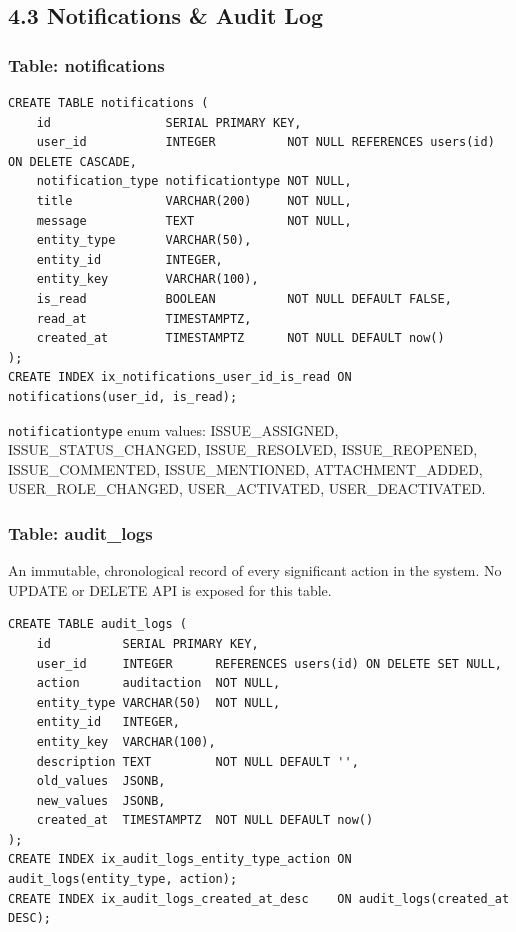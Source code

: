\documentclass[11pt]{article}
\begin{document}
\subsection{4.3 Notifications \& Audit Log}

\subsubsection{Table: notifications}
\begin{lstlisting}
CREATE TABLE notifications (
    id                SERIAL PRIMARY KEY,
    user_id           INTEGER          NOT NULL REFERENCES users(id) ON DELETE CASCADE,
    notification_type notificationtype NOT NULL,
    title             VARCHAR(200)     NOT NULL,
    message           TEXT             NOT NULL,
    entity_type       VARCHAR(50),
    entity_id         INTEGER,
    entity_key        VARCHAR(100),
    is_read           BOOLEAN          NOT NULL DEFAULT FALSE,
    read_at           TIMESTAMPTZ,
    created_at        TIMESTAMPTZ      NOT NULL DEFAULT now()
);
CREATE INDEX ix_notifications_user_id_is_read ON notifications(user_id, is_read);
\end{lstlisting}

\texttt{notificationtype} enum values: ISSUE\_ASSIGNED, ISSUE\_STATUS\_CHANGED, ISSUE\_RESOLVED, ISSUE\_REOPENED, ISSUE\_COMMENTED, ISSUE\_MENTIONED, ATTACHMENT\_ADDED, USER\_ROLE\_CHANGED, USER\_ACTIVATED, USER\_DEACTIVATED.

\subsubsection{Table: audit\_logs}
An immutable, chronological record of every significant action in the system. No UPDATE or DELETE API is exposed for this table.

\begin{lstlisting}
CREATE TABLE audit_logs (
    id          SERIAL PRIMARY KEY,
    user_id     INTEGER      REFERENCES users(id) ON DELETE SET NULL,
    action      auditaction  NOT NULL,
    entity_type VARCHAR(50)  NOT NULL,
    entity_id   INTEGER,
    entity_key  VARCHAR(100),
    description TEXT         NOT NULL DEFAULT '',
    old_values  JSONB,
    new_values  JSONB,
    created_at  TIMESTAMPTZ  NOT NULL DEFAULT now()
);
CREATE INDEX ix_audit_logs_entity_type_action ON audit_logs(entity_type, action);
CREATE INDEX ix_audit_logs_created_at_desc    ON audit_logs(created_at DESC);
\end{lstlisting}
\end{document}
